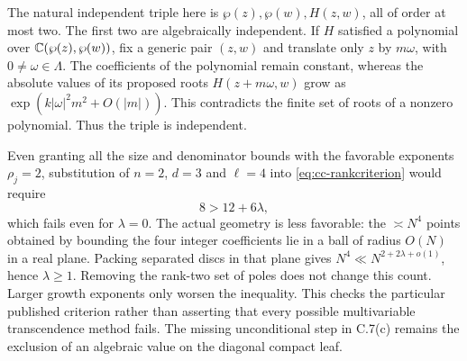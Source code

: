 The natural independent triple here is
$\wp(z),\wp(w),H(z,w)$, all of order at most two.
The first two are algebraically independent. If $H$ satisfied
a polynomial over $\mathbb C(\wp(z),\wp(w))$, fix a generic pair
$(z,w)$ and translate only $z$ by $m\omega$, with
$0\ne\omega\in\Lambda$. The coefficients of the polynomial
remain constant, whereas the absolute values of its proposed
roots $H(z+m\omega,w)$ grow as
$\exp(k|\omega|^2m^2+O(|m|))$. This contradicts the finite
set of roots of a nonzero polynomial. Thus the triple is
independent.

Even granting all the size and denominator bounds with the
favorable exponents $\rho_j=2$, substitution of
$n=2$, $d=3$ and $\ell=4$ into
\eqref{eq:cc-rankcriterion} would require
\[
 8>12+6\lambda,
\]
which fails even for $\lambda=0$. The actual geometry is
less favorable: the $\asymp N^4$ points obtained by bounding
the four integer coefficients lie in a ball of radius $O(N)$
in a real plane. Packing separated discs in that plane gives
$N^4\ll N^{2+2\lambda+o(1)}$, hence $\lambda\ge1$.
Removing the rank-two set of poles does not change this count.
Larger growth exponents only worsen the inequality. This
checks the particular published criterion rather than asserting
that every possible multivariable transcendence method fails.
The missing unconditional step in C.7(c) remains the exclusion
of an algebraic value on the diagonal compact leaf.
